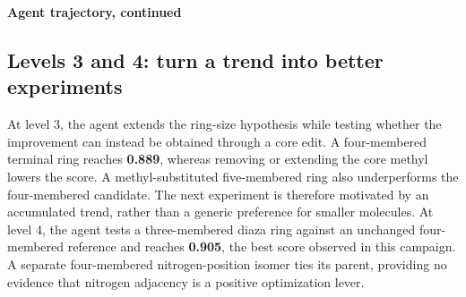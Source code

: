 \documentclass[11pt,a4paper]{article}
\newcommand{\level}[1]{\subsection*{#1}}
\begin{document}
\begin{center}
\end{center}

\newpage
{\large\sffamily\bfseries\color{ink}Agent trajectory, continued}\par
\level{Levels 3 and 4: turn a trend into better experiments}
At level 3, the agent extends the ring-size hypothesis while testing whether the improvement can instead be obtained through a core edit. A four-membered terminal ring reaches \textbf{0.889}, whereas removing or extending the core methyl lowers the score. A methyl-substituted five-membered ring also underperforms the four-membered candidate. The next experiment is therefore motivated by an accumulated trend, rather than a generic preference for smaller molecules. At level 4, the agent tests a three-membered diaza ring against an unchanged four-membered reference and reaches \textbf{0.905}, the best score observed in this campaign. A separate four-membered nitrogen-position isomer ties its parent, providing no evidence that nitrogen adjacency is a positive optimization lever.
\end{document}
